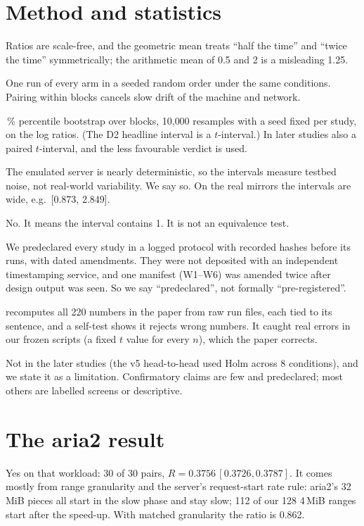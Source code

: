 \section{Method and statistics}
\A Ratios are scale-free, and the geometric mean treats ``half the time'' and ``twice the time'' symmetrically; the arithmetic mean of 0.5 and 2 is a misleading 1.25.

\A One run of every arm in a seeded random order under the same conditions. Pairing within blocks cancels slow drift of the machine and network.

\,\% percentile bootstrap over blocks, 10{,}000 resamples with a seed fixed per study, on the log ratios. (The D2 headline interval is a $t$-interval.) In later studies also a paired $t$-interval, and the less favourable verdict is used.

\A The emulated server is nearly deterministic, so the intervals measure testbed noise, not real-world variability. We say so. On the real mirrors the intervals are wide, e.g.\ [0.873, 2.849].

\A No. It means the interval contains 1. It is not an equivalence test.

\A We predeclared every study in a logged protocol with recorded hashes before its runs, with dated amendments. They were not deposited with an independent timestamping service, and one manifest (W1--W6) was amended twice after design output was seen. So we say ``predeclared'', not formally ``pre-registered''.

\A {} recomputes all 220 numbers in the paper from raw run files, each tied to its sentence, and a self-test shows it rejects wrong numbers. It caught real errors in our frozen scripts (a fixed $t$ value for every $n$), which the paper corrects.

\A Not in the later studies (the v5 head-to-head used Holm across 8 conditions), and we state it as a limitation. Confirmatory claims are few and predeclared; most others are labelled screens or descriptive.

\section{The aria2 result}
\A Yes on that workload: 30 of 30 pairs, $R=0.3756\,[0.3726, 0.3787]$. It comes mostly from range granularity and the server's request-start rate rule: aria2's 32\,MiB pieces all start in the slow phase and stay slow; 112 of our 128 4\,MiB ranges start after the speed-up. With matched granularity the ratio is 0.862.

